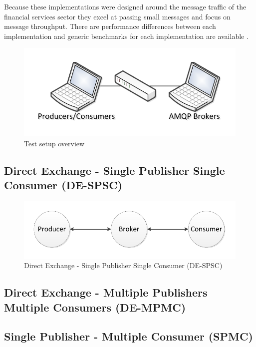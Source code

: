 \documentclass{thesis}
\begin{document}
Because these implementations were designed around the message traffic of the financial services sector they excel at passing small messages and focus on message throughput.  There are performance differences between each implementation and generic benchmarks for each implementation are available \cite{todo}\cite{todo}.

\begin{figure}
\centering
\vspace{2.0in} 
\includegraphics{test_setup}  
\caption{Test setup overview}
\label{Figure 1}  
\end{figure}



\subsection{Direct Exchange - Single Publisher Single Consumer (DE-SPSC)}

\begin{figure}
\centering
\vspace{2.0in} 
\includegraphics{direct_connect}  
\caption{Direct Exchange - Single Publisher Single Consumer (DE-SPSC)}
\label{Figure 2}  
\end{figure}

\subsection{Direct Exchange - Multiple Publishers Multiple Consumers (DE-MPMC)}

\subsection{Single Publisher - Multiple Consumer (SPMC)}
\end{document}
